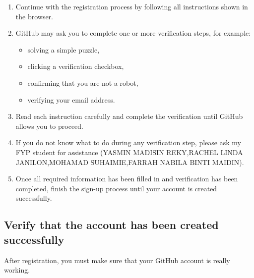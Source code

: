 \begin{enumerate}
    \item Continue with the registration process by following all instructions shown in the browser.

    \item GitHub may ask you to complete one or more verification steps, for example:
    \begin{itemize}
        \item solving a simple puzzle,
        \item clicking a verification checkbox,
        \item confirming that you are not a robot,
        \item verifying your email address.
    \end{itemize}

    \item Read each instruction carefully and complete the verification until GitHub allows you to proceed.

    \item If you do not know what to do during any verification step, please ask my FYP student for assistance (YASMIN MADISIN REKY,RACHEL LINDA JANILON,MOHAMAD SUHAIMIE,FARRAH NABILA BINTI MAIDIN).

    \item Once all required information has been filled in and verification has been completed, finish the sign-up process until your account is created successfully.
\end{enumerate}

\subsection*{Verify that the account has been created successfully}

After registration, you must make sure that your GitHub account is really working.


